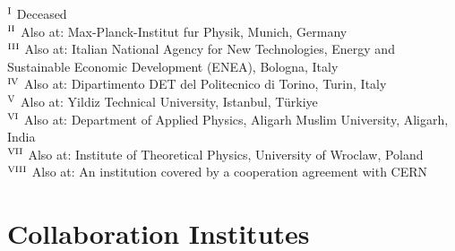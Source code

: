 \begin{flushleft}
$^{\rm I}$ Deceased\\
$^{\rm II}$ Also at: Max-Planck-Institut fur Physik, Munich, Germany\\
$^{\rm III}$ Also at: Italian National Agency for New Technologies, Energy and Sustainable Economic Development (ENEA), Bologna, Italy\\
$^{\rm IV}$ Also at: Dipartimento DET del Politecnico di Torino, Turin, Italy\\
$^{\rm V}$ Also at: Yildiz Technical University, Istanbul, T\"{u}rkiye\\
$^{\rm VI}$ Also at: Department of Applied Physics, Aligarh Muslim University, Aligarh, India\\
$^{\rm VII}$ Also at: Institute of Theoretical Physics, University of Wroclaw, Poland\\
$^{\rm VIII}$ Also at: An institution covered by a cooperation agreement with CERN\\






\section*{Collaboration Institutes} 





\end{flushleft}
